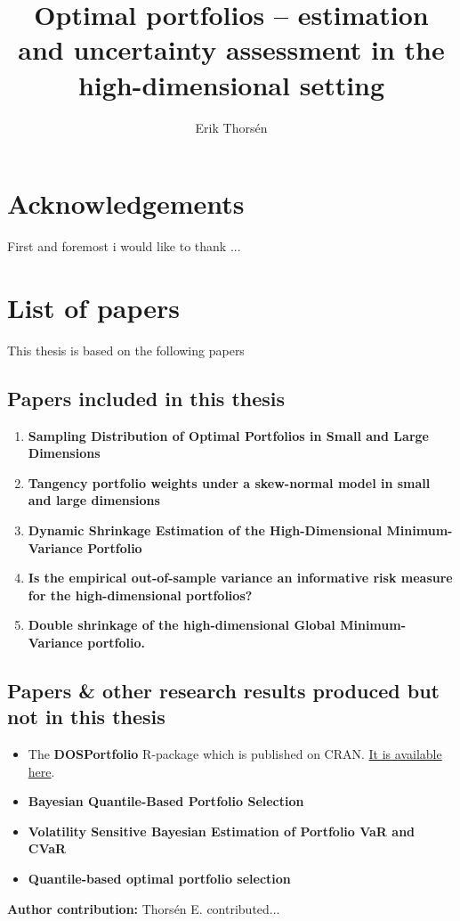 \documentclass[oneside]{book}\usepackage{knitr}
\title{Optimal portfolios -- estimation and uncertainty assessment in the high-dimensional setting}
\author{Erik Thorsén}
\begin{document}


\maketitle



\section*{Acknowledgements}

First and foremost i would like to thank ...

\newpage
\section*{List of papers}
\nocite{bodnar2020sampling, javed2021tangency, bodnar2021dynamic, bodnar2021empirical}
This thesis is based on the following papers

\subsection*{Papers included in this thesis}
\begin{enumerate}[I]
  \item \textbf{Sampling Distribution of Optimal Portfolios in Small and Large Dimensions}
  \item \textbf{Tangency portfolio weights under a skew-normal model in small and large dimensions}
  \item \textbf{Dynamic Shrinkage Estimation of the High-Dimensional Minimum-Variance Portfolio}
  \item \textbf{Is the empirical out-of-sample variance an informative risk measure for the high-dimensional portfolios?}
  \item \textbf{Double shrinkage of the high-dimensional Global Minimum-Variance portfolio.}
\end{enumerate}

\subsection*{Papers \& other research results produced but not in this thesis}

\begin{itemize}
  \item The \textbf{DOSPortfolio} R-package which is published on CRAN. \href{https://CRAN.R-project.org/package=DOSPortfolio}{It is available here}.  
  \item \textbf{Bayesian Quantile-Based Portfolio Selection}
  \item \textbf{Volatility Sensitive Bayesian Estimation of Portfolio VaR and CVaR}
  \item \textbf{Quantile-based optimal portfolio selection}
\end{itemize}
\textbf{Author contribution:} Thors{\'e}n E. contributed...
\end{document}
